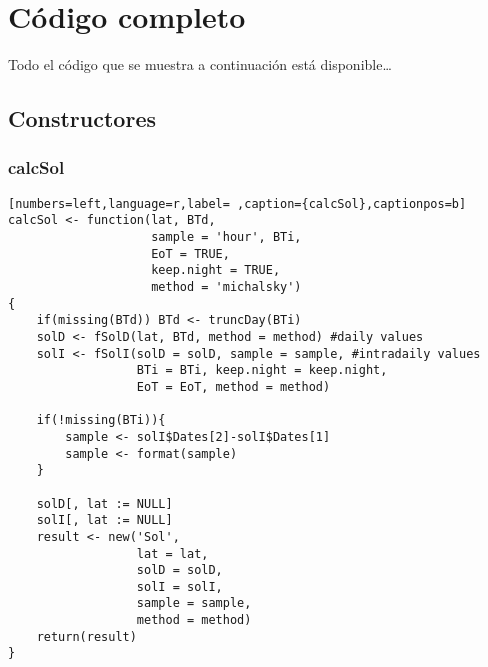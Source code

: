 \chapter{Código completo}
\label{sec:Código completo}

Todo el código que se muestra a continuación está disponible\ldots{}

\section{Constructores}
\label{sec:org1b9f9d0}
\subsection{calcSol}
\label{sec:orga50137b}
\begin{lstlisting}[numbers=left,language=r,label= ,caption={calcSol},captionpos=b]
calcSol <- function(lat, BTd,
                    sample = 'hour', BTi,
                    EoT = TRUE,
                    keep.night = TRUE,
                    method = 'michalsky')
{
    if(missing(BTd)) BTd <- truncDay(BTi)
    solD <- fSolD(lat, BTd, method = method) #daily values
    solI <- fSolI(solD = solD, sample = sample, #intradaily values
                  BTi = BTi, keep.night = keep.night,
                  EoT = EoT, method = method)

    if(!missing(BTi)){
        sample <- solI$Dates[2]-solI$Dates[1]
        sample <- format(sample)
    }

    solD[, lat := NULL]
    solI[, lat := NULL]
    result <- new('Sol',
                  lat = lat,
                  solD = solD,
                  solI = solI,
                  sample = sample,
                  method = method)
    return(result)
}
\end{lstlisting}
